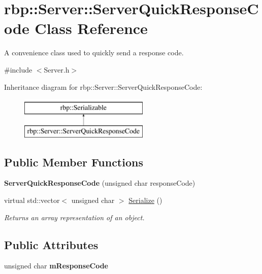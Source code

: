 \hypertarget{classrbp_1_1Server_1_1ServerQuickResponseCode}{}\section{rbp\+:\+:Server\+:\+:Server\+Quick\+Response\+Code Class Reference}
\label{classrbp_1_1Server_1_1ServerQuickResponseCode}


A convenience class used to quickly send a response code.  




{\ttfamily \#include $<$Server.\+h$>$}

Inheritance diagram for rbp\+:\+:Server\+:\+:Server\+Quick\+Response\+Code\+:\begin{figure}[H]
\begin{center}
\leavevmode
\includegraphics[height=2.000000cm]{classrbp_1_1Server_1_1ServerQuickResponseCode}
\end{center}
\end{figure}
\subsection*{Public Member Functions}
\begin{DoxyCompactItemize}
\item 
\hypertarget{classrbp_1_1Server_1_1ServerQuickResponseCode_a9b45a7422f3fff0c0d3132374151ae85}{}{\bfseries Server\+Quick\+Response\+Code} (unsigned char response\+Code)\label{classrbp_1_1Server_1_1ServerQuickResponseCode_a9b45a7422f3fff0c0d3132374151ae85}

\item 
virtual std\+::vector$<$ unsigned char $>$ \hyperlink{classrbp_1_1Server_1_1ServerQuickResponseCode_a1b1aad62ce4446ec6aeb203ea67e9833}{Serialize} ()
\begin{DoxyCompactList}\small\item\em Returns an array representation of an object. \end{DoxyCompactList}\end{DoxyCompactItemize}
\subsection*{Public Attributes}
\begin{DoxyCompactItemize}
\item 
\hypertarget{classrbp_1_1Server_1_1ServerQuickResponseCode_af1d520d92e825fdb59d7a225e706ca38}{}unsigned char {\bfseries m\+Response\+Code}\label{classrbp_1_1Server_1_1ServerQuickResponseCode_af1d520d92e825fdb59d7a225e706ca38}

\end{DoxyCompactItemize}


